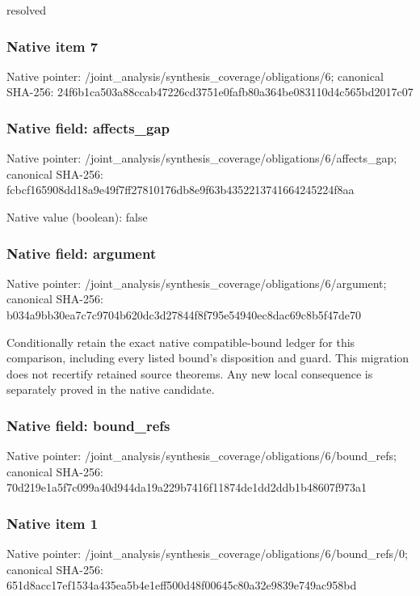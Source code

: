 \documentclass[10pt,a4paper]{article}
\begin{document}
\begingroup\raggedright\sloppy resolved\par\endgroup

\subsubsection{Native item 7}
Native pointer: /joint\_\allowbreak{}analysis/synthesis\_\allowbreak{}coverage/obligations/6; canonical SHA-256: 24f6b1ca503a88ccab47226cd3751e0fafb80a364be083110d4c565bd2017c07

\subsubsection{Native field: affects\_\allowbreak{}gap}
Native pointer: /joint\_\allowbreak{}analysis/synthesis\_\allowbreak{}coverage/obligations/6/affects\_\allowbreak{}gap; canonical SHA-256: fcbcf165908dd18a9e49f7ff27810176db8e9f63b4352213741664245224f8aa

Native value (boolean): false

\subsubsection{Native field: argument}
Native pointer: /joint\_\allowbreak{}analysis/synthesis\_\allowbreak{}coverage/obligations/6/argument; canonical SHA-256: b034a9bb30ea7c7c9704b620dc3d27844f8f795e54940ec8dac69c8b5f47de70

\begingroup\raggedright\sloppy Conditionally retain the exact native compatible-bound ledger for this comparison,\allowbreak{} including every listed bound's disposition and guard. This migration does not recertify retained source theorems. Any new local consequence is separately proved in the native candidate.\par\endgroup

\subsubsection{Native field: bound\_\allowbreak{}refs}
Native pointer: /joint\_\allowbreak{}analysis/synthesis\_\allowbreak{}coverage/obligations/6/bound\_\allowbreak{}refs; canonical SHA-256: 70d219e1a5f7c099a40d944da19a229b7416f11874de1dd2ddb1b48607f973a1

\subsubsection{Native item 1}
Native pointer: /joint\_\allowbreak{}analysis/synthesis\_\allowbreak{}coverage/obligations/6/bound\_\allowbreak{}refs/0; canonical SHA-256: 651d8acc17ef1534a435ea5b4e1eff500d48f00645c80a32e9839e749ac958bd
\end{document}
